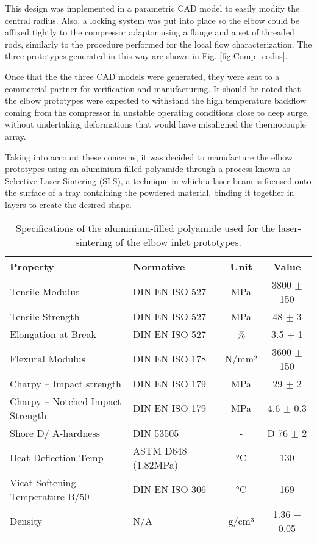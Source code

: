 This design was implemented in a parametric CAD model to easily modify the central radius. Also, a locking system was put into place so the elbow could be affixed tightly to the compressor adaptor using a flange and a set of threaded rods, similarly to the procedure performed for the local flow characterization. The three prototypes generated in this way are shown in Fig. \ref{fig:Comp_codos}.

Once that the the three CAD models were generated, they were sent to a commercial partner for verification and manufacturing. It should be noted that the elbow prototypes were expected to withstand the high temperature backflow coming from the compressor in unstable operating conditions close to deep surge, without undertaking deformations that would have misaligned the thermocouple array.

Taking into account these concerns, it was decided to manufacture the elbow prototypes using an aluminium-filled polyamide through a process known as Selective Laser Sintering (SLS), a technique in which a laser beam is focused onto the surface of a tray containing the powdered material, binding it together in layers to create the desired shape. 

\begin{table}[htbp]
  \centering
  \caption{Specifications of the aluminium-filled polyamide used for the laser-sintering of the elbow inlet prototypes.}
  	\footnotesize
    \begin{tabular}{llcc}
    \addlinespace
    \toprule
    \bf Property & \bf Normative & \bf Unit & \bf Value \\
    \midrule
    Tensile Modulus & DIN EN ISO 527 & MPa   & 3800 $\pm$ 150 \\
    Tensile Strength & DIN EN ISO 527 & MPa   & 48 $\pm$ 3 \\
    Elongation at Break & DIN EN ISO 527 & \%    & 3.5 $\pm$ 1 \\
    Flexural Modulus & DIN EN ISO 178 & N/mm² & 3600 $\pm$ 150 \\
    Charpy – Impact strength & DIN EN ISO 179 & MPa   & 29 $\pm$ 2 \\
    Charpy – Notched Impact Strength & DIN EN ISO 179 & MPa   & 4.6 $\pm$ 0.3 \\
    Shore D/ A-hardness & DIN 53505 &   -   & D 76 $\pm$ 2 \\
    Heat Deflection Temp & ASTM D648
(1.82MPa) & °C    & 130 \\
    Vicat Softening Temperature B/50 & DIN EN ISO 306 & °C    & 169 \\
    Density &   N/A    & g/cm³ & 1.36 $\pm$ 0.05 \\
    \bottomrule
    \end{tabular}
  \label{tab:alumide_data}
\end{table}

